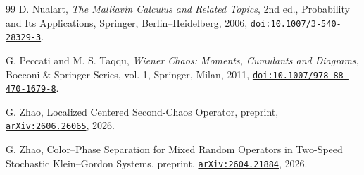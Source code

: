 \documentclass[11pt,reqno]{amsart}
\newcommand{\doi}[1]{\href{https://doi.org/#1}{\nolinkurl{doi:#1}}}
\newcommand{\arxiv}[1]{\href{https://arxiv.org/abs/#1}{\nolinkurl{arXiv:#1}}}
\numberwithin{equation}{section}
\theoremstyle{plain}
\theoremstyle{definition}
\begin{document}
\begin{thebibliography}{99}
D. Nualart,
\emph{The Malliavin Calculus and Related Topics}, 2nd ed.,
Probability and Its Applications, Springer, Berlin--Heidelberg, 2006,
\doi{10.1007/3-540-28329-3}.

G. Peccati and M. S. Taqqu,
\emph{Wiener Chaos: Moments, Cumulants and Diagrams},
Bocconi \& Springer Series, vol. 1, Springer, Milan, 2011,
\doi{10.1007/978-88-470-1679-8}.

G. Zhao,
Localized Centered Second-Chaos Operator,
preprint, \arxiv{2606.26065}, 2026.

G. Zhao,
Color--Phase Separation for Mixed Random Operators in Two-Speed Stochastic Klein--Gordon Systems,
preprint, \arxiv{2604.21884}, 2026.

\end{thebibliography}
\endgroup
\end{document}
